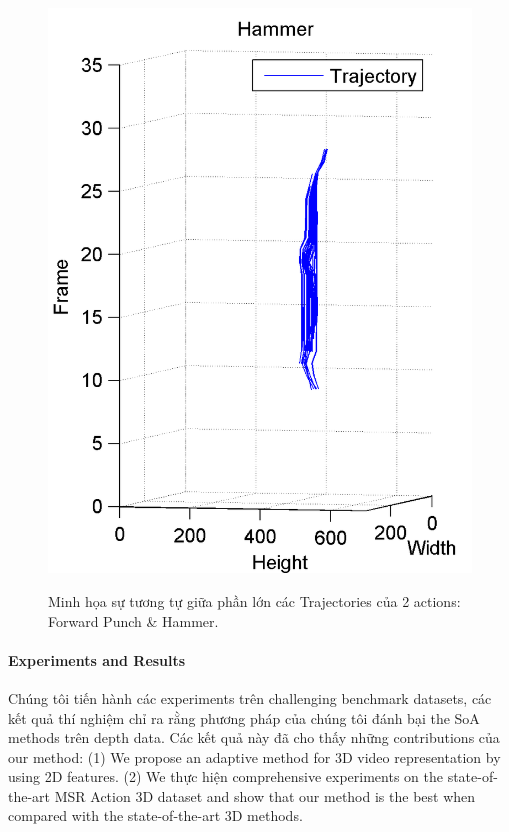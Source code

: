 \documentclass[review]{elsarticle}
\begin{document}
\begin{figure}[H]
\begin{center}
{			\includegraphics[scale=0.5]{Hammer_TOP.png}
		}
	\end{center}
	\caption{\label{fig:Illustration}Minh họa sự tương tự giữa phần lớn các Trajectories của 2 actions: Forward Punch \& Hammer.}
\end{figure}

\paragraph{Experiments and Results}Chúng tôi tiến hành các experiments trên challenging benchmark datasets, các kết quả thí nghiệm chỉ ra rằng phương pháp của chúng tôi đánh bại the SoA methods trên depth data. Các kết quả này đã cho thấy những contributions của our method: (1) We propose an adaptive method for 3D video representation by using 2D features. (2) We thực hiện comprehensive experiments on the state-of-the-art MSR Action 3D dataset and show that our method is the best when compared with the state-of-the-art 3D methods.
\end{document}
